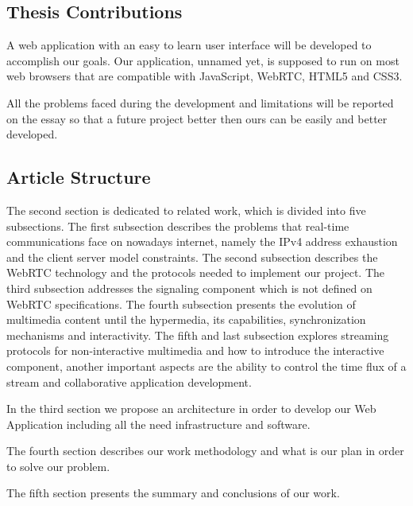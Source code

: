 \subsection{Thesis Contributions} %

	A web application with an easy to learn user interface will be developed to accomplish our goals. Our application, unnamed yet, is supposed to run on most web browsers that are compatible with JavaScript, \ac{WebRTC}, \ac{HTML}5 and \ac{CSS}3.

	All the problems faced during the development and limitations will be reported on the essay so that a future project better then ours can be easily and better developed.

\subsection{Article Structure} %

	The second section is dedicated to related work, which is divided into five subsections. The first subsection describes the problems that real-time communications face on nowadays internet, namely the \ac{IPv4} address exhaustion and the client server model constraints. The second subsection describes the \ac{WebRTC} technology and the protocols needed to implement our project. The third subsection addresses the signaling component which is not defined on \ac{WebRTC} specifications. The fourth subsection presents the evolution of multimedia content until the hypermedia, its capabilities, synchronization mechanisms and interactivity. The  fifth and last subsection explores streaming protocols for non-interactive multimedia and how to introduce the interactive component, another important aspects are the ability to control the time flux of a stream and collaborative application development.

	In the third section we propose an architecture in order to develop our Web Application including all the need infrastructure and software.

	The fourth section describes our work methodology and what is our plan in order to solve our problem.

	The fifth section presents the summary and conclusions of our work.

